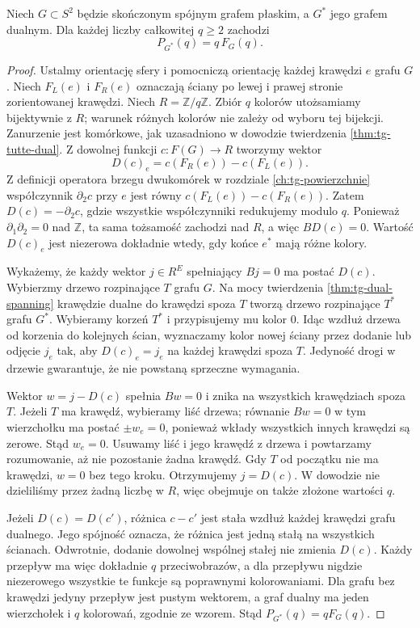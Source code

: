 \begin{twierdzenie}
\label{thm:tg-flow-color-dual}
Niech $G\subset S^2$ będzie skończonym spójnym grafem płaskim,
a $G^*$ jego grafem dualnym. Dla każdej liczby całkowitej $q\ge2$ zachodzi
\[
 P_{G^*}(q)=q\,F_G(q).
\]
\end{twierdzenie}

\begin{proof}
Ustalmy orientację sfery i pomocniczą orientację każdej
krawędzi $e$ grafu $G$. Niech $F_L(e)$ i $F_R(e)$ oznaczają
ściany po lewej i prawej stronie zorientowanej krawędzi.
Niech $R=\mathbb Z/q\mathbb Z$. Zbiór $q$ kolorów
utożsamiamy bijektywnie z $R$; warunek różnych kolorów
nie zależy od wyboru tej bijekcji. Zanurzenie jest
komórkowe, jak uzasadniono w dowodzie twierdzenia
\ref{thm:tg-tutte-dual}. Z dowolnej funkcji
$c:F(G)\to R$ tworzymy wektor
\[
 D(c)_e=c(F_R(e))-c(F_L(e)).
\]
Z definicji operatora brzegu dwukomórek w rozdziale
\ref{ch:tg-powierzchnie} współczynnik $\partial_2 c$
przy $e$ jest równy $c(F_L(e))-c(F_R(e))$.
Zatem $D(c)=-\partial_2 c$, gdzie wszystkie współczynniki
redukujemy modulo $q$. Ponieważ $\partial_1\partial_2=0$
nad $\mathbb Z$, ta sama tożsamość zachodzi nad $R$,
a więc $BD(c)=0$. Wartość $D(c)_e$ jest niezerowa
dokładnie wtedy, gdy końce $e^*$ mają różne kolory.

Wykażemy, że każdy wektor $j\in R^E$ spełniający $Bj=0$
ma postać $D(c)$. Wybierzmy drzewo rozpinające $T$ grafu $G$.
Na mocy twierdzenia \ref{thm:tg-dual-spanning} krawędzie
dualne do krawędzi spoza $T$ tworzą drzewo rozpinające
$T^*$ grafu $G^*$. Wybieramy korzeń $T^*$ i przypisujemy
mu kolor $0$. Idąc wzdłuż drzewa od korzenia do kolejnych
ścian, wyznaczamy kolor nowej ściany przez dodanie lub
odjęcie $j_e$ tak, aby $D(c)_e=j_e$ na każdej krawędzi
spoza $T$. Jedyność drogi w drzewie gwarantuje, że nie
powstaną sprzeczne wymagania.

Wektor $w=j-D(c)$ spełnia $Bw=0$ i znika na wszystkich
krawędziach spoza $T$. Jeżeli $T$ ma krawędź, wybieramy
liść drzewa; równanie $Bw=0$ w tym wierzchołku ma postać
$\pm w_e=0$, ponieważ wkłady wszystkich innych krawędzi
są zerowe. Stąd $w_e=0$. Usuwamy liść i jego krawędź
z drzewa i powtarzamy rozumowanie, aż nie pozostanie
żadna krawędź. Gdy $T$ od początku nie ma krawędzi,
$w=0$ bez tego kroku. Otrzymujemy $j=D(c)$.
W dowodzie nie dzieliliśmy przez żadną liczbę w $R$,
więc obejmuje on także złożone wartości $q$.

Jeżeli $D(c)=D(c')$, różnica $c-c'$ jest stała wzdłuż
każdej krawędzi grafu dualnego. Jego spójność oznacza,
że różnica jest jedną stałą na wszystkich ścianach.
Odwrotnie, dodanie dowolnej wspólnej stałej nie zmienia
$D(c)$. Każdy przepływ ma więc dokładnie $q$ przeciwobrazów,
a dla przepływu nigdzie niezerowego wszystkie te funkcje
są poprawnymi kolorowaniami. Dla grafu bez krawędzi
jedyny przepływ jest pustym wektorem, a graf dualny ma
jeden wierzchołek i $q$ kolorowań, zgodnie ze wzorem.
Stąd $P_{G^*}(q)=qF_G(q)$.
\end{proof}

